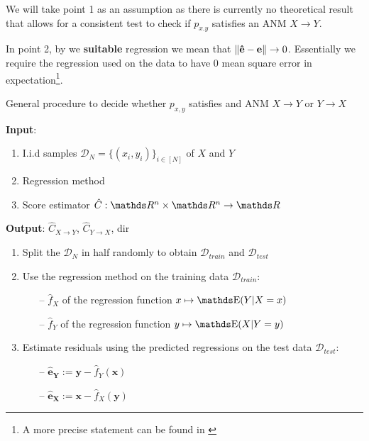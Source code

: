 We will take point 1 as an assumption as there is currently no theoretical result that allows for a consistent 
test to check if $p_{x. y}$ satisfies an ANM $X \rightarrow Y$. 

In point 2, by we \textbf{suitable} regression we mean that $\left\lVert\mathbf{\hat{e}} - \mathbf{e}\right\rVert \rightarrow 0$.
Essentially we require the regression used on the data to have 0 mean square error in expectation\footnote{A 
more precise statement can be found in \cite{Mooij2016jmlr}}. 

\begin{algorithm}[H]%

    \caption{General procedure to decide whether $p_{x, y}$ satisfies and ANM $X \rightarrow Y$
        or $Y \rightarrow X$}
  
    \textbf{Input}:

    \begin{enumerate}
        \item I.i.d samples $\mathcal{D}_N = \{ (x_i, y_i )\}_{i \in [N]}$ of $X$ and $Y$
        \item Regression method
        \item Score estimator $\hat{C}: \R^n \times \R^n \rightarrow \R$
    \end{enumerate}
    
    \textbf{Output}: $\hat{C}_{X \rightarrow Y}$, $\hat{C}_{Y \rightarrow X}$, dir

    \begin{enumerate}

        \item Split the $\mathcal{D}_N$ in half randomly to obtain  $\mathcal{D}_{train}$ 
        and $\mathcal{D}_{test}$

        \item Use the regression method on the training data $\mathcal{D}_{train}$:
        \begin{itemize}
            \item[--] $\hat{f}_X$ of the regression function $x \mapsto \E(Y | X=x)$
            \item[--] $\hat{f}_Y$ of the regression function $y \mapsto \E(X | Y=y)$
        \end{itemize}

        \item Estimate residuals using the predicted regressions on the test data $\mathcal{D}_{test}$:
        \begin{itemize}
            \item[--] $ \mathbf{\hat{e}_Y} := \mathbf{y} - \hat{f}_Y(\mathbf{x})$
            \item[--] $ \mathbf{\hat{e}_X} := \mathbf{x} - \hat{f}_X(\mathbf{y})$
        \end{itemize}


\end{enumerate}
\end{algorithm}
